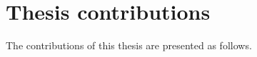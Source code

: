 \section{Thesis contributions}
\label{sec:contribution}

The contributions of this thesis are presented as follows.

